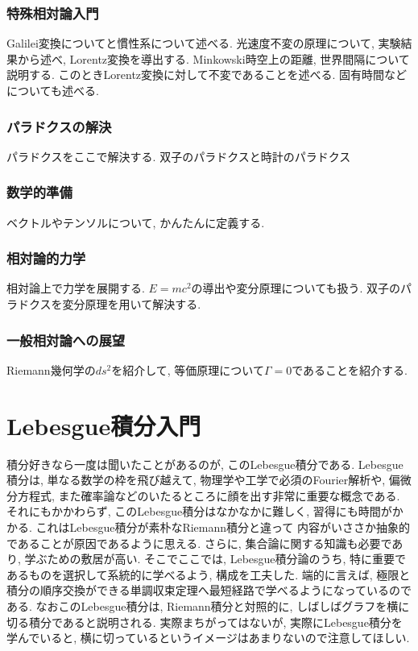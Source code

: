 \documentclass[a4j,dvipdfmx]{jsarticle}
\numberwithin{equation}{section}
\begin{document}
    \section{特殊相対論入門}
        Galilei変換についてと慣性系について述べる. 光速度不変の原理について, 実験結果から述べ, Lorentz変換を導出する. 
         Minkowski時空上の距離, 世界間隔について説明する. このときLorentz変換に対して不変であることを述べる.
        固有時間などについても述べる.
    \clearpage
    \section{パラドクスの解決}
        パラドクスをここで解決する. 双子のパラドクスと時計のパラドクス
    \clearpage
    \section{数学的準備}
        ベクトルやテンソルについて, かんたんに定義する.
    \clearpage
    \section{相対論的力学}
        相対論上で力学を展開する. $E=mc^2$の導出や変分原理についても扱う. 双子のパラドクスを変分原理を用いて解決する.
    \clearpage
    \section{一般相対論への展望}
        Riemann幾何学の$ds^2$を紹介して, 等価原理について$\Gamma=0$であることを紹介する.
    \clearpage

    \part{Lebesgue積分入門}
    \begin{screen}
        積分好きなら一度は聞いたことがあるのが, このLebesgue積分である. Lebesgue積分は, 単なる数学の枠を飛び越えて, 
        物理学や工学で必須のFourier解析や, 偏微分方程式, また確率論などのいたるところに顔を出す非常に重要な概念である.
        それにもかかわらず, このLebesgue積分はなかなかに難しく, 習得にも時間がかかる. これはLebesgue積分が素朴なRiemann積分と違って
        内容がいささか抽象的であることが原因であるように思える. さらに, 集合論に関する知識も必要であり, 学ぶための敷居が高い.
        そこでここでは, Lebesgue積分論のうち, 特に重要であるものを選択して系統的に学べるよう, 構成を工夫した. 
        端的に言えば, 極限と積分の順序交換ができる単調収束定理へ最短経路で学べるようになっているのである.
        なおこのLebesgue積分は, Riemann積分と対照的に, しばしばグラフを横に切る積分であると説明される. 実際まちがってはないが, 
        実際にLebesgue積分を学んでいると, 横に切っているというイメージはあまりないので注意してほしい.
    \end{screen}
    \clearpage
\end{document}
